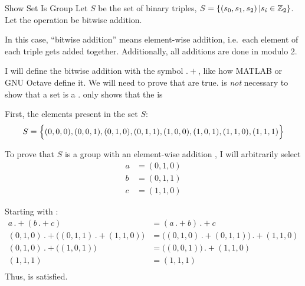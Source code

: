 \begin{example}{Show Set Is Group}
  Let $S$ be the set of binary triples, $S = \lbrace \left( s_{0}, s_{1}, s_{2} \right) \vert s_{i} \in \operatorname{\mathbb{Z}}_{2} \rbrace$.
  Let the operation be bitwise addition.
  \tcblower{}
  \begin{remark*}
    In this case, ``bitwise addition'' means element-wise addition, i.e.\ each element of each triple gets added together.
    Additionally, all additions are done in modulo 2.
  \end{remark*}
  I will define the bitwise addition  with the symbol $.+$, like how MATLAB or GNU Octave define it.
  We will need to prove that  are true.
   is \emph{not} necessary to show that a set is a .
   only shows that the  is 

  First, the elements present in the set $S$:
  \begin{equation*}
    S = \Bigl\lbrace (0, 0, 0), (0, 0, 1), (0, 1, 0), (0, 1, 1), (1, 0, 0), (1, 0, 1), (1, 1, 0), (1, 1, 1) \Bigr\rbrace
  \end{equation*}

  To prove that $S$ is a group with an element-wise addition , I will arbitrarily select
  \begin{align*}
    a &= (0, 1, 0) \\
    b &= (0, 1, 1) \\
    c &= (1, 1, 0)
  \end{align*}

  Starting with :
  \begin{align*}
    a \, .+ (b \, .+ c) &= (a \, .+ b) \, .+ c \\
    (0, 1, 0) \, .+ \bigl( (0, 1, 1) \, .+ (1, 1, 0) \bigr) &= \bigl( (0, 1, 0) \, .+ (0, 1, 1) \bigr) \, .+ (1, 1, 0) \\
    (0, 1, 0) \, .+ \bigl( (1, 0, 1) \bigr) &= \bigl( (0, 0, 1) \bigr) \, .+ (1, 1, 0) \\
    (1, 1, 1)  &= (1, 1, 1) \\
  \end{align*}
  Thus,  is satisfied.


\end{example}
